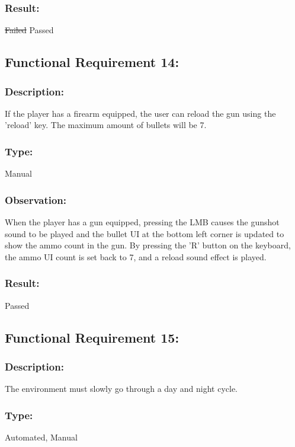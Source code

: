 \documentclass[12pt, titlepage]{article}
\begin{document}
\subsubsection[Pass / Fail:] {Result: } {\sout{Failed}} {\color{magenta} Passed}


\subsection{Functional Requirement 14: } 

\subsubsection{Description: }If the player has a firearm equipped, the user can reload the gun using the 'reload' key. The maximum amount of bullets will be 7.

\subsubsection{Type: } Manual

\subsubsection{Observation: } When the player has a gun equipped, pressing the LMB causes the gunshot sound to be played and the bullet UI at the bottom left corner is updated to show the ammo count in the gun. By pressing the 'R' button on the keyboard, the ammo UI count is set back to 7, and a reload sound effect is played.

\subsubsection[Pass / Fail:] {Result: } Passed


\subsection{Functional Requirement 15: } 

\subsubsection{Description: }The environment must slowly go through a day and night cycle.

\subsubsection{Type: } Automated, Manual
\end{document}
